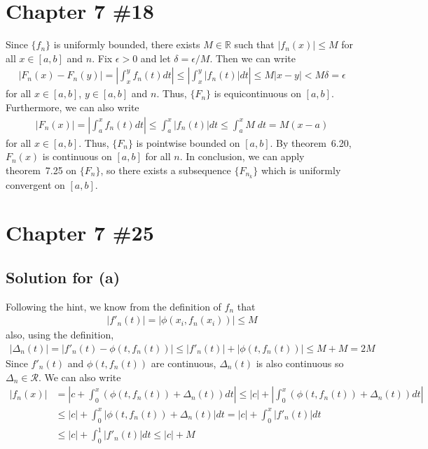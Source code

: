 \documentclass{scrartcl}
\begin{document}
\section{Chapter 7 \#18}
Since \(\{f_n\}\) is uniformly bounded, there exists \(M \in \mathbb{R}\) such
that \(|f_n(x)| \le M\) for all \(x \in [a, b]\) and \(n\). Fix \(\epsilon >
0\) and let \(\delta = \epsilon / M\). Then we can write
\begin{align*}
  |F_n(x) - F_n(y)|
  = \left| \int^y_x f_n(t) dt \right|
  \le \left| \int^y_x |f_n(t)| dt \right|
  \le M|x - y|
  < M\delta
  = \epsilon
\end{align*}
for all \(x \in [a, b]\), \(y \in [a, b]\) and \(n\). Thus, \(\{F_n\}\) is
equicontinuous on \([a, b]\). Furthermore, we can also write
\begin{align*}
  |F_n(x)|
  = \left| \int^x_a f_n(t) dt \right|
  \le \int^x_a |f_n(t)| dt
  \le \int^x_a M\; dt
  = M(x - a)
\end{align*}
for all \(x \in [a, b]\). Thus, \(\{F_n\}\) is pointwise bounded on \([a, b]\).
By theorem~6.20, \(F_n(x)\) is continuous on \([a, b]\) for all \(n\). In
conclusion, we can apply theorem~7.25 on \(\{F_n\}\), so there exists a
subsequence \(\{F_{n_k}\}\) which is uniformly convergent on \([a, b]\).

\section{Chapter 7 \#25}
\subsection{Solution for (a)}
Following the hint, we know from the definition of \(f_n\) that
\begin{align*}
  |f'_n(t)| = |\phi(x_i, f_n(x_i))| \le M
\end{align*}
also, using the definition,
\begin{align*}
  |\Delta_n(t)|
  = |f'_n(t) - \phi(t, f_n(t))|
  \le |f'_n(t)| + |\phi(t, f_n(t))|
  \le M + M
  = 2M
\end{align*}
Since \(f'_n(t)\) and \(\phi(t, f_n(t))\) are continuous, \(\Delta_n(t)\) is
also continuous so \(\Delta_n \in \mathscr{R}\).
We can also write
\begin{align*}
  |f_n(x)|
  &= \left| c + \int^x_0 (\phi(t, f_n(t)) + \Delta_n(t)) dt \right|
  \le |c| + \left| \int^x_0 (\phi(t, f_n(t)) + \Delta_n(t)) dt \right| \\
  &\le |c| + \int^x_0 |\phi(t, f_n(t)) + \Delta_n(t)| dt
  = |c| + \int^x_0 |f'_n(t)| dt \\
  &\le |c| + \int^1_0 |f'_n(t)| dt
  \le |c| + M
\end{align*}
\end{document}
